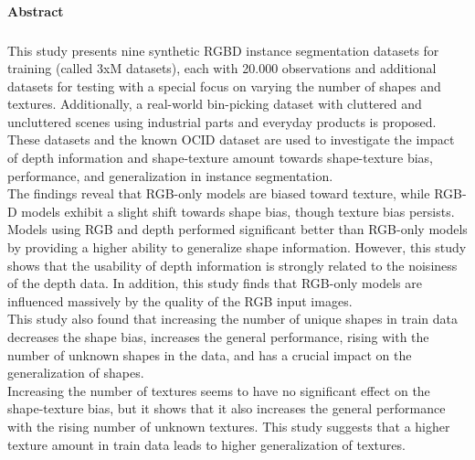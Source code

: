\clearpage
\thispagestyle{empty}
\textsf{\large\textbf{Abstract}}
\subsubsection*{\hsmatitelen}%

This study presents nine synthetic RGBD instance segmentation datasets for training (called 3xM datasets), each with 20.000 observations and additional datasets for testing with a special focus on varying the number of shapes and textures. Additionally, a real-world bin-picking dataset with cluttered and uncluttered scenes using industrial parts and everyday products is proposed. These datasets and the known OCID dataset are used to investigate the impact of depth information and shape-texture amount towards shape-texture bias, performance, and generalization in instance segmentation.\\
The findings reveal that RGB-only models are biased toward texture, while RGB-D models exhibit a slight shift towards shape bias, though texture bias persists. Models using RGB and depth performed significant better than RGB-only models by providing a higher ability to generalize shape information.  However, this study shows that the usability of depth information is strongly related to the noisiness of the depth data. In addition, this study finds that RGB-only models are influenced massively by the quality of the RGB input images.\\
This study also found that increasing the number of unique shapes in train data decreases the shape bias, increases the general performance, rising with the number of unknown shapes in the data, and has a crucial impact on the generalization of shapes. \\
Increasing the number of textures seems to have no significant effect on the shape-texture bias, but it shows that it also increases the general performance with the rising number of unknown textures. This study suggests that a higher texture amount in train data leads to higher generalization of textures.




